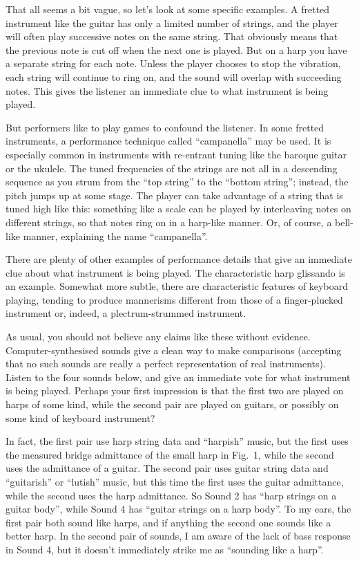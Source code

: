   That all seems a bit vague, so let’s look at some specific examples. A 
  fretted instrument like the guitar has only a limited number of strings, and 
  the player will often play successive notes on the same string. That 
  obviously means that the previous note is cut off when the next one is 
  played. But on a harp you have a separate string for each note. Unless the 
  player chooses to stop the vibration, each string will continue to ring on, 
  and the sound will overlap with succeeding notes. This gives the listener an 
  immediate clue to what instrument is being played. 

  But performers like to play games to confound the listener. In some fretted 
  instruments, a performance technique called “campanella” may be used. It is 
  especially common in instruments with re-entrant tuning like the baroque 
  guitar or the ukulele. The tuned frequencies of the strings are not all in a 
  descending sequence as you strum from the “top string” to the “bottom 
  string”; instead, the pitch jumps up at some stage. The player can take 
  advantage of a string that is tuned high like this: something like a scale 
  can be played by interleaving notes on different strings, so that notes ring 
  on in a harp-like manner. Or, of course, a bell-like manner, explaining the 
  name “campanella”. 

  There are plenty of other examples of performance details that give an 
  immediate clue about what instrument is being played. The characteristic harp 
  glissando is an example. Somewhat more subtle, there are characteristic 
  features of keyboard playing, tending to produce mannerisms different from 
  those of a finger-plucked instrument or, indeed, a plectrum-strummed 
  instrument. 

  As usual, you should not believe any claims like these without evidence. 
  Computer-synthesised sounds give a clean way to make comparisons (accepting 
  that no such sounds are really a perfect representation of real instruments). 
  Listen to the four sounds below, and give an immediate vote for what 
  instrument is being played. Perhaps your first impression is that the first 
  two are played on harps of some kind, while the second pair are played on 
  guitars, or possibly on some kind of keyboard instrument? 

\audio{}

\audio{}

\audio{}

\audio{}

  In fact, the first pair use harp string data and ``harpish'' music, but the 
  first uses the measured bridge admittance of the small harp in Fig.\ 1, while 
  the second uses the admittance of a guitar. The second pair uses guitar 
  string data and ``guitarish'' or ``lutish'' music, but this time the first 
  uses the guitar admittance, while the second uses the harp admittance. So 
  Sound 2 has ``harp strings on a guitar body'', while Sound 4 has ``guitar 
  strings on a harp body''. To my ears, the first pair both sound like harps, 
  and if anything the second one sounds like a better harp. In the second pair 
  of sounds, I am aware of the lack of bass response in Sound 4, but it doesn't 
  immediately strike me as ``sounding like a harp''. 

